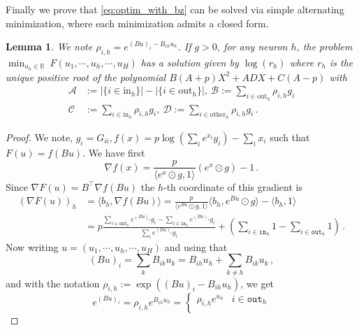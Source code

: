 \documentclass{article}
\theoremstyle{plain}
\newtheorem{lemma}[theorem]{Lemma}
\theoremstyle{definition}
\theoremstyle{remark}
\def\R{{\mathbb{R}}}
\newcommand{\inh}{{\mathrm{in}_h}}
\newcommand{\outh}{{\mathrm{out}_h}}
\newcommand{\otherh}{{\mathrm{other}_h}}
\newcommand{\Ah}{\mathcal{A}}
\newcommand{\Bh}{\mathcal{B}}
\newcommand{\Ch}{\mathcal{C}}
\newcommand{\Dh}{\mathcal{D}}
\begin{document}
{Finally we prove that \eqref{eq:optim_with_bz} can be solved via simple alternating minimization, where each minimization admits a closed form. 
\begin{lemma}
\label{lemma:calculate_degree_pol_2}
We note $\rho_{i,h} = e^{(Bu)_i-
B_{ih} u_{h}
 }$. 
If $g > 0$, for any neuron $h$, the problem $\min_{u_h \in \R} \ F(u_1, \cdots, u_h, \cdots, u_H)$ has a solution given 
by $\log(r_h)$ where $r_h$ is the unique positive root of the polynomial 
$B(A + p) X^2 + A D X + C(A-p)$ with 
\begin{equation*}
\begin{split}
\Ah &:= |\{i \in \inh\}| - |\{i \in \outh\}|, \ \Bh := \sum_{i \in \outh} \rho_{i,h} g_i \\
\Ch &:= \sum_{i \in \inh} \rho_{i,h} g_i, \ \Dh := \sum_{i \in \otherh} \rho_{i,h} g_i\,.
\end{split}
\end{equation*}
\end{lemma}
\begin{proof}
We note, $g_i = G_{ii}, f(x) = p\log(\sum_i e^{x_i} g_i) - \sum_i x_i$ such that $F(u) = f(Bu)$. We have first
\begin{equation}
\nabla f(x) = \frac{p}{\langle e^{x} \odot g, 1\rangle}(e^{x} \odot g) - 1\,.
\end{equation}
Since $\nabla F(u) = B^\top \nabla f(Bu)$ the $h$-th coordinate of this gradient is
\begin{equation}
\label{eq:grad_h}
\begin{split}
(\nabla F(u))_h &= \langle b_h, \nabla f(Bu) \rangle =  \frac{p}{\langle e^{Bu} \odot g, 1\rangle} 
\langle b_h, e^{Bu} \odot g \rangle -  \langle b_h, 1\rangle\\
&= p\frac{\sum_{i \in \texttt{out}_h} e^{(Bu)_i}g_i- \sum_{i \in \texttt{in}_h} e^{(Bu)_i}g_i}{\sum_{i} e^{(Bu)_i}g_i} + 
(\sum_{i\in \texttt{in}_h} 1 - \sum_{i\in \texttt{out}_h} 1)\,.
\end{split}
\end{equation}
Now writing $u = (u_1, \cdots, u_h, \cdots, u_H)$ and using that
\begin{equation}
(Bu)_i = \sum_{k} B_{ik}u_k = B_{ih}u_h + \sum_{k \neq h} B_{ik} u_k
\,,
\end{equation}
and with the notation $\rho_{i,h} := \exp((Bu)_i- 
B_{ih} u_{h}
)$, we get
\begin{equation}
e^{(Bu)_i} =
\rho_{i,h} e^{
B_{ih}u_{h}
} = 
 \begin{cases}
\rho_{i,h} e^{u_h} & i \in \texttt{out}_h \\

\end{cases}
\end{equation}
\end{proof}}
\end{document}

